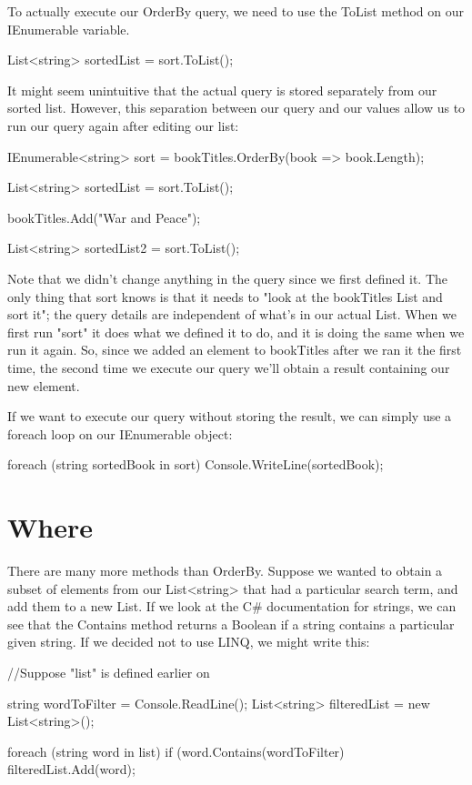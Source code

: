 \documentclass[oneside, openany] {book}
\begin{document}
To actually execute our OrderBy query, we need to use the ToList method on our IEnumerable variable.
\begin{CSharp}
List<string> sortedList = sort.ToList();
\end{CSharp}

It might seem unintuitive that the actual query is stored separately from our sorted list. However, this separation between our query and our values allow us to run our query again after editing our list:

\begin{CSharp}
IEnumerable<string> sort = bookTitles.OrderBy(book => book.Length);

List<string> sortedList = sort.ToList();

bookTitles.Add("War and Peace");

List<string> sortedList2 = sort.ToList();
\end{CSharp}


Note that we didn't change anything in the query since we first defined it. The only thing that sort knows is that it needs to "look at the bookTitles List and sort it"; the query details are independent of what's in our actual List. When we first run "sort" it does what we defined it to do, and it is doing the same when we run it again. So, since we added an element to bookTitles after we ran it the first time, the second time we execute our query we'll obtain a result containing our new element.

If we want to execute our query without storing the result, we can simply use a foreach loop on our IEnumerable object:
\begin{CSharp}
foreach (string sortedBook in sort)
{
    Console.WriteLine(sortedBook);
}
\end{CSharp}
\section{Where}
There are many more methods than OrderBy. Suppose we wanted to obtain a subset of elements from our List<string> that had a particular search term, and add them to a new List. If we look at the C\# documentation for strings, we can see that the Contains method returns a Boolean if a string contains a particular given string. If we decided not to use LINQ, we might write this:

\begin{CSharp}
//Suppose "list" is defined earlier on

string wordToFilter = Console.ReadLine();
List<string> filteredList = new List<string>();

foreach (string word in list)
{
  if (word.Contains(wordToFilter)
  {
    filteredList.Add(word);
  }
}
\end{CSharp}
\end{document}
